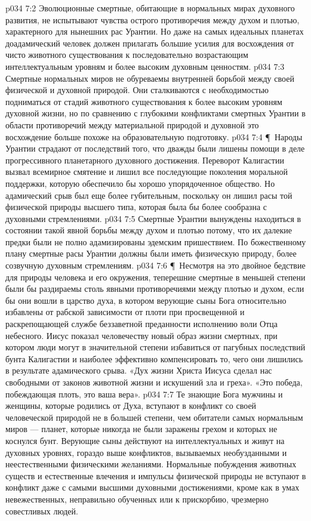 \vs p034 7:2 Эволюционные смертные, обитающие в нормальных мирах духовного развития, не испытывают чувства острого противоречия между духом и плотью, характерного для нынешних рас Урантии. Но даже на самых идеальных планетах доадамический человек должен прилагать большие усилия для восхождения от чисто животного существования к последовательно возрастающим интеллектуальным уровням и более высоким духовным ценностям.
\vs p034 7:3 Смертные нормальных миров не обуреваемы внутренней борьбой между своей физической и духовной природой. Они сталкиваются с необходимостью подниматься от стадий животного существования к более высоким уровням духовной жизни, но по сравнению с глубокими конфликтами смертных Урантии в области противоречий между материальной природой и духовной это восхождение больше похоже на образовательную подготовку.
\vs p034 7:4 \P\ Народы Урантии страдают от последствий того, что дважды были лишены помощи в деле прогрессивного планетарного духовного достижения. Переворот Калигастии вызвал всемирное смятение и лишил все последующие поколения моральной поддержки, которую обеспечило бы хорошо упорядоченное общество. Но адамический срыв был еще более губительным, поскольку он лишил расы той физической природы высшего типа, которая была бы более сообразна с духовными стремлениями.
\vs p034 7:5 Смертные Урантии вынуждены находиться в состоянии такой явной борьбы между духом и плотью потому, что их далекие предки были не полно адамизированы эдемским пришествием. По божественному плану смертные расы Урантии должны были иметь физическую природу, более созвучную духовным стремлениям.
\vs p034 7:6 \P\ Несмотря на это двойное бедствие для природы человека и его окружения, теперешние смертные в меньшей степени были бы раздираемы столь явными противоречиями между плотью и духом, если бы они вошли в царство духа, в котором верующие сыны Бога относительно избавлены от рабской зависимости от плоти при просвещенной и раскрепощающей службе беззаветной преданности исполнению воли Отца небесного. Иисус показал человечеству новый образ жизни смертных, при котором люди могут в значительной степени избавиться от пагубных последствий бунта Калигастии и наиболее эффективно компенсировать то, чего они лишились в результате адамического срыва. «Дух жизни Христа Иисуса сделал нас свободными от законов животной жизни и искушений зла и греха». «Это победа, побеждающая плоть, это ваша вера».
\vs p034 7:7 Те знающие Бога мужчины и женщины, которые родились от Духа, вступают в конфликт со своей человеческой природой не в большей степени, чем обитатели самых нормальным миров --- планет, которые никогда не были заражены грехом и которых не коснулся бунт. Верующие сыны действуют на интеллектуальных и живут на духовных уровнях, гораздо выше конфликтов, вызываемых необузданными и неестественными физическими желаниями. Нормальные побуждения животных существ и естественные влечения и импульсы физической природы не вступают в конфликт даже с самыми высшими духовными достижениями, кроме как в умах невежественных, неправильно обученных или к прискорбию, чрезмерно совестливых людей.
